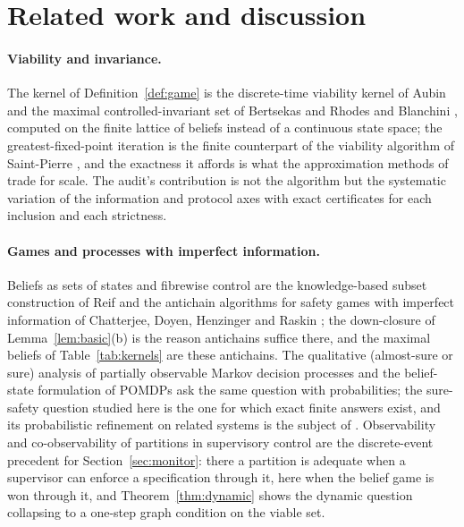 \section{Related work and discussion}\label{sec:related}

\paragraph{Viability and invariance.}
The kernel of Definition~\ref{def:game} is the discrete-time viability kernel of Aubin \cite{Aubin1991} and the maximal controlled-invariant set of Bertsekas and Rhodes \cite{BertsekasRhodes1971} and Blanchini \cite{Blanchini1999}, computed on the finite lattice of beliefs instead of a continuous state space; the greatest-fixed-point iteration is the finite counterpart of the viability algorithm of Saint-Pierre \cite{SaintPierre1994}, and the exactness it affords is what the approximation methods of \cite{Deffuant2007} trade for scale. The audit's contribution is not the algorithm but the systematic variation of the information and protocol axes with exact certificates for each inclusion and each strictness.

\paragraph{Games and processes with imperfect information.}
Beliefs as sets of states and fibrewise control are the knowledge-based subset construction of Reif \cite{Reif1984} and the antichain algorithms for safety games with imperfect information of Chatterjee, Doyen, Henzinger and Raskin \cite{CDHR2007}; the down-closure of Lemma~\ref{lem:basic}(b) is the reason antichains suffice there, and the maximal beliefs of Table~\ref{tab:kernels} are these antichains. The qualitative (almost-sure or sure) analysis of partially observable Markov decision processes \cite{CDH2010} and the belief-state formulation of POMDPs \cite{SmallwoodSondik1973,Kaelbling1998} ask the same question with probabilities; the sure-safety question studied here is the one for which exact finite answers exist, and its probabilistic refinement on related systems is the subject of \cite{Abaee2026prob}. Observability and co-observability of partitions in supervisory control \cite{LinWonham1988,CassandrasLafortune2008} are the discrete-event precedent for Section~\ref{sec:monitor}: there a partition is adequate when a supervisor can enforce a specification through it, here when the belief game is won through it, and Theorem~\ref{thm:dynamic} shows the dynamic question collapsing to a one-step graph condition on the viable set.

